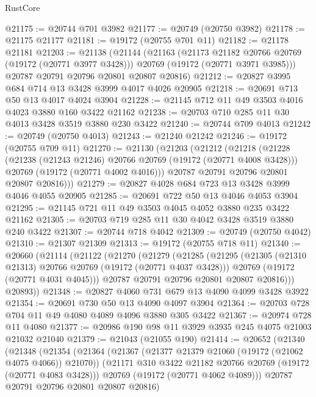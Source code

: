 \begin{lexlean}{RustCore}
\begin{coremodule}
@21175 := @20744 @701 @3982
@21177 := @20749 (@20750 @3982)
@21178 := @21175 @21177
@21181 := @19172 (@20755 @701 @11)
@21182 := @21178 @21181
@21203 := @21138
    (@21144
      (@21163
        (@21173 @21182 @20766 @20769 (@19172 (@20771 @3977 @3428)))
        @20769
        (@19172 (@20771 @3971 @3985)))
      @20787
      @20791
      @20796
      @20801
      @20807
      @20816)
@21212 := @20827 @3995 @684 @714 @13 @3428 @3999 @4017 @4026 @20905
@21218 := @20691 @713 @50 @13 @4017 @4024 @3904
@21228 := @21145 @712 @11 @49 @3503 @4016 @4023 @3880 @160 @3422 @21162
@21238 := @20703 @710 @285 @11 @30 @4013 @3428 @3519 @3880 @230 @3422
@21240 := @20744 @709 @4013
@21242 := @20749 (@20750 @4013)
@21243 := @21240 @21242
@21246 := @19172 (@20755 @709 @11)
@21270 := @21130
    (@21203
      (@21212
        (@21218
          (@21228
            (@21238 (@21243 @21246) @20766 @20769 (@19172 (@20771 @4008 @3428)))
            @20769
            (@19172 (@20771 @4002 @4016)))
          @20787
          @20791
          @20796
          @20801
          @20807
          @20816)))
@21279 := @20827 @4028 @684 @723 @13 @3428 @3999 @4046 @4055 @20905
@21285 := @20691 @722 @50 @13 @4046 @4053 @3904
@21295 := @21145 @721 @11 @49 @3503 @4045 @4052 @3880 @235 @3422 @21162
@21305 := @20703 @719 @285 @11 @30 @4042 @3428 @3519 @3880 @240 @3422
@21307 := @20744 @718 @4042
@21309 := @20749 (@20750 @4042)
@21310 := @21307 @21309
@21313 := @19172 (@20755 @718 @11)
@21340 := @20660
    (@21114
      (@21122
        (@21270
          (@21279
            (@21285
              (@21295
                (@21305 (@21310 @21313) @20766 @20769 (@19172 (@20771 @4037 @3428)))
                @20769
                (@19172 (@20771 @4031 @4045)))
              @20787
              @20791
              @20796
              @20801
              @20807
              @20816)))
        @20893))
@21348 := @20827 @4060 @731 @679 @13 @4090 @4099 @3428 @3922
@21354 := @20691 @730 @50 @13 @4090 @4097 @3904
@21364 := @20703 @728 @704 @11 @49 @4080 @4089 @4096 @3880 @305 @3422
@21367 := @20974 @728 @11 @4080
@21377 := @20986 @190 @98 @11 @3929 @3935 @245 @4075 @21003 @21032 @21040
@21379 := @21043 (@21055 @190)
@21414 := @20652
    (@21340
      (@21348
        (@21354
          (@21364
            (@21367 (@21377 @21379 @21060 (@19172 (@21062 @4075 @4066)) @21070))
            (@21171 @310 @3422 @21182 @20766 @20769 (@19172 (@20771 @4083 @3428)))
            @20769
            (@19172 (@20771 @4062 @4089)))
          @20787
          @20791
          @20796
          @20801
          @20807
          @20816)

\end{coremodule}
\end{lexlean}
